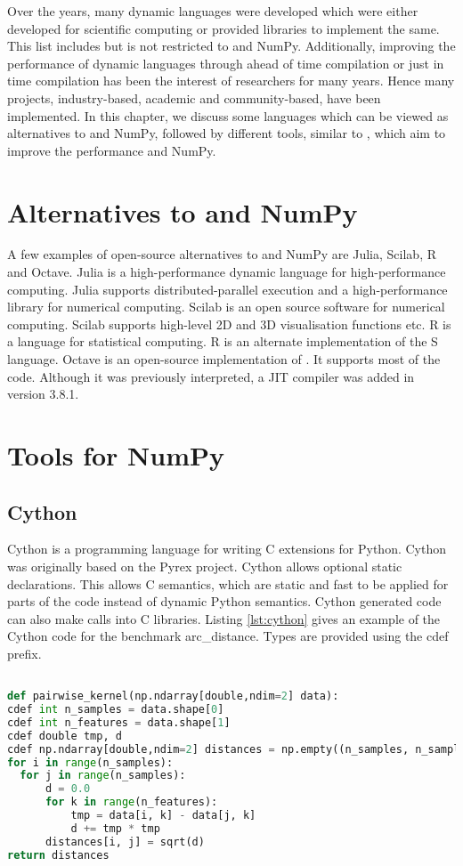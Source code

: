 Over the years, many dynamic languages were developed which were either developed for scientific computing or provided libraries to implement the same. This list includes but is not restricted to \matlab\cite{matlab} and NumPy\cite{numpy}. Additionally, improving the performance of dynamic languages through ahead of time compilation or just in time compilation has been the interest of researchers for many years. Hence many projects, industry-based, academic and community-based, have been implemented. In this chapter, we discuss some languages which can be viewed as alternatives to \matlab and NumPy, followed by different tools, similar to \velocty, which aim to improve the performance \matlab and NumPy.
\section{Alternatives to \matlab and NumPy}
A few examples of open-source alternatives to \matlab and NumPy are Julia\cite{julia}, Scilab\cite{scilab}, R\cite{rlang} and Octave\cite{octave}. Julia is a high-performance dynamic language for high-performance computing. Julia supports distributed-parallel execution and a high-performance library for numerical computing. Scilab is an open source software for numerical computing. Scilab supports high-level 2D and 3D visualisation functions etc. R is a language for statistical computing. R is an alternate implementation of the S language. Octave is an open-source implementation of \matlab. It supports most of the \matlab code. Although it was previously interpreted, a JIT compiler was added in version 3.8.1.
\section{Tools for NumPy}
\subsection{Cython}
Cython is a programming language for writing C extensions for Python. Cython was originally based on the Pyrex project\cite{pyrex}. Cython allows optional static declarations. This allows C semantics, which are static and fast to be applied for parts of the code instead of dynamic Python semantics. Cython generated code can also make calls into C libraries. Listing \ref{lst:cython} gives an example of the Cython code for the benchmark arc\_distance. Types are provided using the \textsf{cdef} prefix. 

\begin{lstlisting}[language=python, label={lst:cython}, caption={ The Cython code with static type annotations that is taken as input by Cython to generate C code. The example is of the arc\_distance benchmark}]

def pairwise_kernel(np.ndarray[double,ndim=2] data):
cdef int n_samples = data.shape[0]
cdef int n_features = data.shape[1]
cdef double tmp, d
cdef np.ndarray[double,ndim=2] distances = np.empty((n_samples, n_samples))
for i in range(n_samples):
  for j in range(n_samples):
	  d = 0.0
	  for k in range(n_features):
		  tmp = data[i, k] - data[j, k]
		  d += tmp * tmp
	  distances[i, j] = sqrt(d)
return distances
\end{lstlisting}

